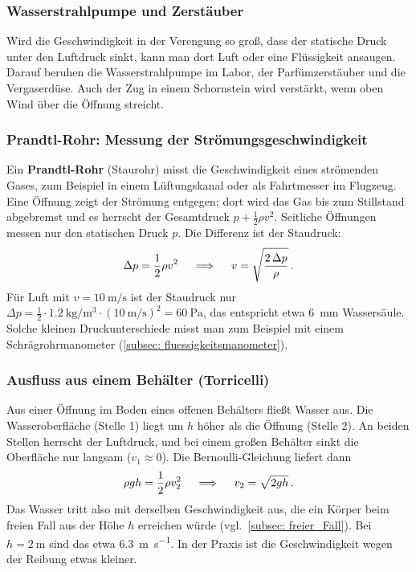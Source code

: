 \subsubsection*{Wasserstrahlpumpe und Zerstäuber}
Wird die Geschwindigkeit in der Verengung so groß, dass der statische Druck unter den Luftdruck sinkt, kann man dort Luft oder eine Flüssigkeit ansaugen. Darauf beruhen die Wasserstrahlpumpe im Labor, der Parfümzerstäuber und die Vergaserdüse. Auch der Zug in einem Schornstein wird verstärkt, wenn oben Wind über die Öffnung streicht.

\subsubsection*{Prandtl-Rohr: Messung der Strömungsgeschwindigkeit}
Ein \textbf{Prandtl-Rohr} (Staurohr) misst die Geschwindigkeit eines strömenden Gases, zum Beispiel in einem Lüftungskanal oder als Fahrtmesser im Flugzeug. Eine Öffnung zeigt der Strömung entgegen; dort wird das Gas bis zum Stillstand abgebremst und es herrscht der Gesamtdruck $p + \frac{1}{2}\rho v^2$. Seitliche Öffnungen messen nur den statischen Druck $p$. Die Differenz ist der Staudruck:
\begin{equation}\label{eq: prandtl_rohr}
    \Delta p = \frac{1}{2}\rho v^2 \quad \implies \quad v = \sqrt{\frac{2\,\Delta p}{\rho}} \,.
\end{equation}
Für Luft mit $v = \SI{10}{\meter\per\second}$ ist der Staudruck nur $\Delta p = \frac{1}{2}\cdot \SI{1.2}{\kilogram\per\meter\cubed} \cdot (\SI{10}{\meter\per\second})^2 = \SI{60}{\pascal}$, das entspricht etwa \SI{6}{\milli\meter} Wassersäule. Solche kleinen Druckunterschiede misst man zum Beispiel mit einem Schrägrohrmanometer (\cref{subsec: fluessigkeitsmanometer}).

\subsubsection*{Ausfluss aus einem Behälter (Torricelli)}
Aus einer Öffnung im Boden eines offenen Behälters fließt Wasser aus. Die Wasseroberfläche (Stelle 1) liegt um $h$ höher als die Öffnung (Stelle 2). An beiden Stellen herrscht der Luftdruck, und bei einem großen Behälter sinkt die Oberfläche nur langsam ($v_1 \approx 0$). Die Bernoulli-Gleichung liefert dann
\begin{equation}\label{eq: torricelli_ausfluss}
    \rho g h = \frac{1}{2} \rho v_2^2 \quad \implies \quad v_2 = \sqrt{2 g h} \,.
\end{equation}
Das Wasser tritt also mit derselben Geschwindigkeit aus, die ein Körper beim freien Fall aus der Höhe $h$ erreichen würde (vgl.~\cref{subsec: freier_Fall}). Bei $h = \SI{2}{\meter}$ sind das etwa \SI{6.3}{\meter\per\second}. In der Praxis ist die Geschwindigkeit wegen der Reibung etwas kleiner.

